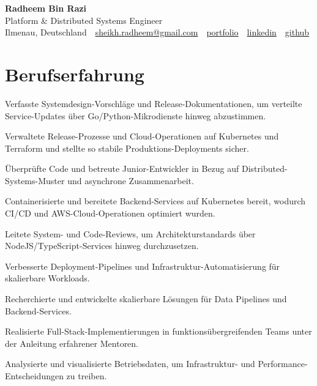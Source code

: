 \documentclass[11pt,a4paper]{resume}
\makeatletter
\newcommand{\Portfolio}{https://radheem.github.io/my-cv}
\newcommand{\PortfolioText}{portfolio}
\newcommand{\GitHub}{https://github.com/radheem}
\newcommand{\LinkedIn}{https://www.linkedin.com/in/radheem-razi}
\newcommand{\Email}{sheikh.radheem@gmail.com}
\makeatother
\begin{document}
\clearpage
{}

\begin{center}
  {\huge\bfseries Radheem Bin Razi}\\[3pt]
  {\large Platform \& Distributed Systems Engineer}\\[6pt]
  \small
  Ilmenau, Deutschland \,\textbar\,
  \href{mailto:\Email}{\Email} \,\textbar\,
  \href{\Portfolio}{\PortfolioText} \,\textbar\,
  \href{\LinkedIn}{linkedin} \,\textbar\,
  \href{\GitHub}{github}
\end{center}
\vspace{2pt}

\section{Berufserfahrung}

\bullets
  \item Verfasste Systemdesign-Vorschläge und Release-Dokumentationen, um verteilte Service-Updates über Go/Python-Mikrodienste hinweg abzustimmen.
  \item Verwaltete Release-Prozesse und Cloud-Operationen auf Kubernetes und Terraform und stellte so stabile Produktions-Deployments sicher.
  \item Überprüfte Code und betreute Junior-Entwickler in Bezug auf Distributed-Systems-Muster und asynchrone Zusammenarbeit.
\bulletsend
\vspace{3pt}
\bullets
  \item Containerisierte und bereitete Backend-Services auf Kubernetes bereit, wodurch CI/CD und AWS-Cloud-Operationen optimiert wurden.
  \item Leitete System- und Code-Reviews, um Architekturstandards über NodeJS/TypeScript-Services hinweg durchzusetzen.
  \item Verbesserte Deployment-Pipelines und Infrastruktur-Automatisierung für skalierbare Workloads.
\bulletsend
\vspace{3pt}
\bullets
  \item Recherchierte und entwickelte skalierbare Lösungen für Data Pipelines und Backend-Services.
  \item Realisierte Full-Stack-Implementierungen in funktionsübergreifenden Teams unter der Anleitung erfahrener Mentoren.
  \item Analysierte und visualisierte Betriebsdaten, um Infrastruktur- und Performance-Entscheidungen zu treiben.
\bulletsend
\vspace{3pt}
\end{document}
